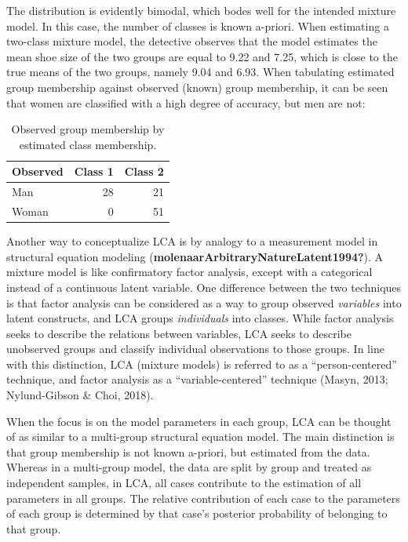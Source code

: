 \documentclass[
  ,man,floatsintext]{apa6}
\begin{document}
The distribution is evidently bimodal, which bodes well for the intended
mixture model. In this case, the number of classes is known a-priori.
When estimating a two-class mixture model, the detective observes that
the model estimates the mean shoe size of the two groups are equal to
9.22 and
7.25, which is close to the true
means of the two groups, namely 9.04
and 6.93. When tabulating estimated
group membership against observed (known) group membership, it can be
seen that women are classified with a high degree of accuracy, but men
are not:

\begin{table}

\caption{\label{tab:tabshoe}Observed group membership by estimated class membership.}
\centering
\begin{tabular}[t]{l|r|r}
\hline
Observed & Class 1 & Class 2\\
\hline
Man & 28 & 21\\
\hline
Woman & 0 & 51\\
\hline
\end{tabular}
\end{table}

Another way to conceptualize LCA is by analogy to a measurement model in
structural equation modeling (\textbf{molenaarArbitraryNatureLatent1994?}). A
mixture model is like confirmatory factor analysis, except with a
categorical instead of a continuous latent variable. One difference
between the two techniques is that factor analysis can be considered as
a way to group observed \emph{variables} into latent constructs, and LCA
groups \emph{individuals} into classes. While factor analysis seeks to
describe the relations between variables, LCA seeks to describe
unobserved groups and classify individual observations to those groups.
In
line with this distinction, LCA (mixture models) is referred to as a
``person-centered'' technique, and factor analysis as a
``variable-centered'' technique (Masyn, 2013; Nylund-Gibson \& Choi, 2018).

When the focus is on the model parameters in each group, LCA can be
thought of as similar to a multi-group structural equation model. The
main distinction is that group membership is not known a-priori, but
estimated from the data. Whereas in a multi-group model, the data are
split by group and treated as independent samples, in LCA, all cases
contribute to the estimation of all parameters in all groups. The
relative contribution of each case to the parameters of each group is
determined by that case's posterior probability of belonging to that
group.
\end{document}
